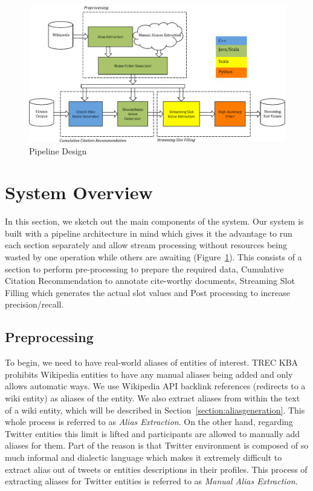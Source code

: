
\begin{figure}
\centering
\includegraphics[width=6in]{./images/sdl-eps-converted-to.pdf}
\vspace*{-.1in} \caption{Pipeline Design }\label{fig:system}
\vspace*{-.2in}
\end{figure}

\section{System Overview}

In this section, we sketch out the main components of the system. Our system is 
built with a pipeline architecture in mind which gives it the advantage to run 
each section separately and allow stream processing without resources being wasted 
by one operation while others are awaiting (Figure~\ref{fig:system}).
This consists of a section to perform pre-processing to prepare the required data, 
Cumulative Citation Recommendation to annotate cite-worthy documents, Streaming 
Slot Filling which generates the actual slot values and Post processing to 
increase precision/recall. 


\subsection{Preprocessing}
\label{sec:preproc}

To begin, we need to have real-world aliases of entities of interest. TREC KBA
prohibits Wikipedia entities to have any manual aliases being added and only
allows automatic ways. We use Wikipedia API backlink references
(redirects to a wiki entity) as aliases of the entity. We also extract 
aliases from within the text of a wiki entity, which will be described in
Section~\ref{section:aliasgeneration}. This whole process is referred to as
\textit{Alias Extraction}. On the other hand, regarding Twitter entities this
limit is lifted and participants are allowed to manually add aliases for them.
Part of the reason is that Twitter environment is composed of so much informal
and dialectic language which makes it extremely difficult to extract alias out
of tweets or entities descriptions in their profiles. This process of extracting
aliases for Twitter entities is referred to as \textit{Manual Alias Extraction}.

